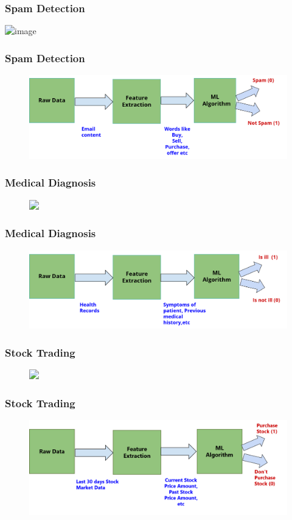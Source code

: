 \documentclass[aspectratio=169,14pt]{beamer}
\begin{document}
\begin{frame}
\frametitle{Spam Detection}
\centering
	\includegraphics<2>[width=15cm]{Images/AAv_Picture5.png}

\end{frame}

\begin{frame}
\frametitle{Spam Detection}
\begin{figure}
	\includegraphics[width=15cm]{Images/AAv_Picture6.png}
\end{figure}
\end{frame}

\begin{frame}
\frametitle{Medical Diagnosis}
\begin{figure}
	\includegraphics<2>[width=15cm]{Images/AAv_Picture7.png}
\end{figure}
\end{frame}

\begin{frame}
\frametitle{Medical Diagnosis}
\begin{figure}
	\includegraphics[width=15cm]{Images/AAv_Picture8.png}
\end{figure}
\end{frame}

\begin{frame}
\frametitle{Stock Trading}
\begin{figure}
	\includegraphics<2>[width=14cm]{Images/AAv_Picture9.png}
\end{figure}
\end{frame}

\begin{frame}
\frametitle{Stock Trading}
\begin{figure}
	\includegraphics[width=14cm]{Images/AAv_Picture10.png}
\end{figure}
\end{frame}
\end{document}
